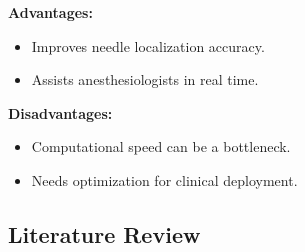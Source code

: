 \documentclass[12pt]{article}
\begin{document}
\textbf{Advantages:}
\begin{itemize}
    \item Improves needle localization accuracy.
    \item Assists anesthesiologists in real time.
\end{itemize}

\textbf{Disadvantages:}
\begin{itemize}
    \item Computational speed can be a bottleneck.
    \item Needs optimization for clinical deployment.
\end{itemize}
\newpage

\subsection{Literature Review}
\end{document}
